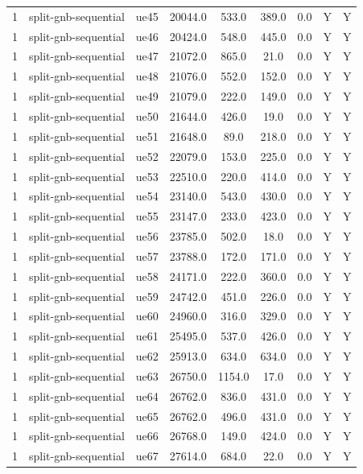\begin{table}[ht]
\begin{tabular}{|c|c|c|c|c|c|c|c|c|}
1 & split-gnb-sequential & ue45 & 20044.0 & 533.0 & 389.0 & 0.0 & Y & Y \\
1 & split-gnb-sequential & ue46 & 20424.0 & 548.0 & 445.0 & 0.0 & Y & Y \\
1 & split-gnb-sequential & ue47 & 21072.0 & 865.0 & 21.0 & 0.0 & Y & Y \\
1 & split-gnb-sequential & ue48 & 21076.0 & 552.0 & 152.0 & 0.0 & Y & Y \\
1 & split-gnb-sequential & ue49 & 21079.0 & 222.0 & 149.0 & 0.0 & Y & Y \\
1 & split-gnb-sequential & ue50 & 21644.0 & 426.0 & 19.0 & 0.0 & Y & Y \\
1 & split-gnb-sequential & ue51 & 21648.0 & 89.0 & 218.0 & 0.0 & Y & Y \\
1 & split-gnb-sequential & ue52 & 22079.0 & 153.0 & 225.0 & 0.0 & Y & Y \\
1 & split-gnb-sequential & ue53 & 22510.0 & 220.0 & 414.0 & 0.0 & Y & Y \\
1 & split-gnb-sequential & ue54 & 23140.0 & 543.0 & 430.0 & 0.0 & Y & Y \\
1 & split-gnb-sequential & ue55 & 23147.0 & 233.0 & 423.0 & 0.0 & Y & Y \\
1 & split-gnb-sequential & ue56 & 23785.0 & 502.0 & 18.0 & 0.0 & Y & Y \\
1 & split-gnb-sequential & ue57 & 23788.0 & 172.0 & 171.0 & 0.0 & Y & Y \\
1 & split-gnb-sequential & ue58 & 24171.0 & 222.0 & 360.0 & 0.0 & Y & Y \\
1 & split-gnb-sequential & ue59 & 24742.0 & 451.0 & 226.0 & 0.0 & Y & Y \\
1 & split-gnb-sequential & ue60 & 24960.0 & 316.0 & 329.0 & 0.0 & Y & Y \\
1 & split-gnb-sequential & ue61 & 25495.0 & 537.0 & 426.0 & 0.0 & Y & Y \\
1 & split-gnb-sequential & ue62 & 25913.0 & 634.0 & 634.0 & 0.0 & Y & Y \\
1 & split-gnb-sequential & ue63 & 26750.0 & 1154.0 & 17.0 & 0.0 & Y & Y \\
1 & split-gnb-sequential & ue64 & 26762.0 & 836.0 & 431.0 & 0.0 & Y & Y \\
1 & split-gnb-sequential & ue65 & 26762.0 & 496.0 & 431.0 & 0.0 & Y & Y \\
1 & split-gnb-sequential & ue66 & 26768.0 & 149.0 & 424.0 & 0.0 & Y & Y \\
1 & split-gnb-sequential & ue67 & 27614.0 & 684.0 & 22.0 & 0.0 & Y & Y \\

\end{tabular}
\end{table}
